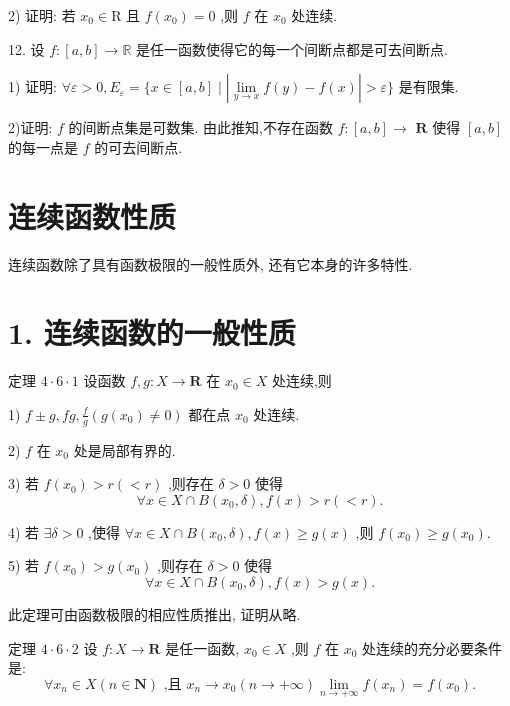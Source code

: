 2) 证明: 若 ${x}_{0} \in  \mathrm{R}$ 且 $f\left( {x}_{0}\right)  = 0$ ,则 $f$ 在 ${x}_{0}$ 处连续.

12. 设 $f : \left\lbrack  {a,b}\right\rbrack   \rightarrow  \mathbb{R}$ 是任一函数使得它的每一个间断点都是可去间断点.

1) 证明: $\forall \varepsilon  > 0,{E}_{\varepsilon } = \{ x \in  \left\lbrack  {a,b}\right\rbrack   \mid  \left| {\mathop{\lim }\limits_{{y \rightarrow  x}}f\left( y\right)  - f\left( x\right) }\right|  > \varepsilon \}$ 是有限集.

2)证明: $f$ 的间断点集是可数集. 由此推知,不存在函数 $f : \left\lbrack  {a,b}\right\rbrack   \rightarrow$  $\mathbf{R}$ 使得 $\left\lbrack  {a,b}\right\rbrack$ 的每一点是 $f$ 的可去间断点.

\section{连续函数性质}

连续函数除了具有函数极限的一般性质外, 还有它本身的许多特性.

\section*{1. 连续函数的一般性质}

定理 $4 \cdot  6 \cdot  1$ 设函数 $f,g : X \rightarrow  \mathbf{R}$ 在 ${x}_{0} \in  X$ 处连续,则

1) $f \pm  g,{fg},\frac{f}{g}\left( {g\left( {x}_{0}\right)  \neq  0}\right)$ 都在点 ${x}_{0}$ 处连续.

2) $f$ 在 ${x}_{0}$ 处是局部有界的.

3) 若 $f\left( {x}_{0}\right)  > r\left( { < r}\right)$ ,则存在 $\delta  > 0$ 使得
$$\forall x \in  X \cap  B\left( {{x}_{0},\delta }\right) ,f\left( x\right)  > r\left( { < r}\right) .$$

4) 若 $\exists \delta  > 0$ ,使得 $\forall x \in  X \cap  B\left( {{x}_{0},\delta }\right) ,f\left( x\right)  \geq  g\left( x\right)$ ,则 $f\left( {x}_{0}\right)  \geq  g\left( {x}_{0}\right) .$

5) 若 $f\left( {x}_{0}\right)  > g\left( {x}_{0}\right)$ ,则存在 $\delta  > 0$ 使得
$$\forall x \in  X \cap  B\left( {{x}_{0},\delta }\right) ,f\left( x\right)  > g\left( x\right) .$$

此定理可由函数极限的相应性质推出, 证明从略.

定理 $4 \cdot  6 \cdot  2$ 设 $f : X \rightarrow  \mathbf{R}$ 是任一函数, ${x}_{0} \in  X$ ,则 $f$ 在 ${x}_{0}$ 处连续的充分必要条件是:
$$\forall {x}_{n} \in  X\left( {n \in  \mathbf{N}}\right) \text{ ,且 }{x}_{n} \rightarrow  {x}_{0}\left( {n \rightarrow   + \infty }\right) \mathop{\lim }\limits_{{n \rightarrow   + \infty }}f\left( {x}_{n}\right)  = f\left( {x}_{0}\right) .$$

